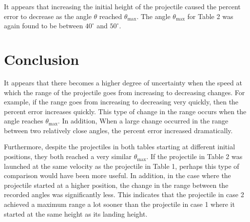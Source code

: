 \documentclass[12pt]{article}
\begin{document}
It appears that increasing the initial height of the projectile caused the percent error to decrease as the angle $\theta $ reached $\theta_\text{max}$. The angle $\theta_\text{max}$ for Table 2 was again found to be between $40^\circ$ and $50^\circ$.
\section{Conclusion}
It appears that there becomes a higher degree of uncertainty when the speed at which the range of the projectile goes from increasing to decreasing changes. For example, if the range goes from increasing to decreasing very quickly, then the percent error increases quickly. This type of change in the range occurs when the angle reaches $\theta_\text{max}$. In addition, When a large change occurred in the range between two relatively close angles, the percent error increased dramatically.

Furthermore, despite the projectiles in both tables starting at different initial positions, they both reached a very similar $\theta_\text{max}$. If the projectile in Table 2 was launched at the same velocity as the projectile in Table 1, perhaps this type of comparison would have been more useful. In addition, in the case where the projectile started at a higher position, the change in the range between the recorded angles was significantly less. This indicates that the projectile in case 2 achieved a maximum range a lot sooner than the projectile in case 1 where it started at the same height as its landing height.
\end{document}
